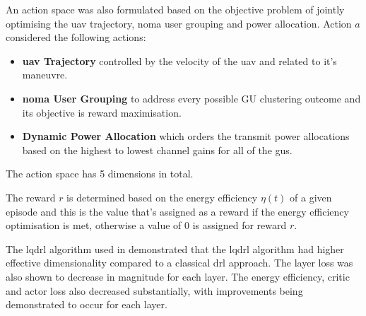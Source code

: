 An action space was also formulated based on the objective problem of jointly optimising the \acrshort{uav} trajectory, \acrshort{noma} user grouping and power allocation. 
Action $a$ considered the following actions:
\begin{itemize}
    \item \textbf{\acrshort{uav} Trajectory} controlled by the velocity of the \acrshort{uav} and related to it's maneuvre.
    \item \textbf{\acrshort{noma} User Grouping} to address every possible GU clustering outcome and its objective is reward maximisation. 
    \item \textbf{Dynamic Power Allocation} which orders the transmit power allocations based on the highest to lowest channel gains for all of the \acrshort{gu}s.
\end{itemize}

The action space has 5 dimensions in total.

The reward $r$ is determined based on the energy efficiency $\eta(t)$ of a given episode and this is the value that's assigned as a reward if the energy efficiency optimisation is met, otherwise a value of $0$ is assigned for reward $r$. 

The \acrshort{lqdrl} algorithm used in \cite{silvirianti_layerwise_2024} demonstrated that the \acrshort{lqdrl} algorithm had higher effective dimensionality compared to a classical \acrshort{drl} approach. 
The layer loss was also shown to decrease in magnitude for each layer. 
The energy efficiency, critic and actor loss also decreased substantially, with improvements being demonstrated to occur for each layer. 